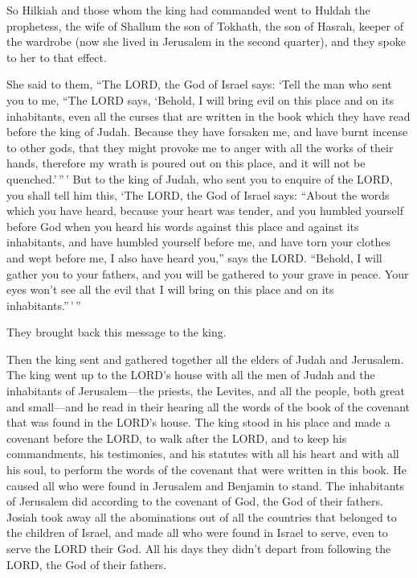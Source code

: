  So Hilkiah and those whom the king had commanded went to
Huldah the prophetess, the wife of Shallum the son of Tokhath, the son
of Hasrah, keeper of the wardrobe (now she lived in Jerusalem in the
second quarter), and they spoke to her to that effect.

 She said to them, ``The LORD, the God of Israel says:
`Tell the man who sent you to me,  ``The LORD says,
`Behold, I will bring evil on this place and on its inhabitants, even
all the curses that are written in the book which they have read before
the king of Judah.  Because they have forsaken me, and have
burnt incense to other gods, that they might provoke me to anger with
all the works of their hands, therefore my wrath is poured out on this
place, and it will not be quenched.'\,''\,'  But to the
king of Judah, who sent you to enquire of the LORD, you shall tell him
this, `The LORD, the God of Israel says: ``About the words which you
have heard,  because your heart was tender, and you humbled
yourself before God when you heard his words against this place and
against its inhabitants, and have humbled yourself before me, and have
torn your clothes and wept before me, I also have heard you,'' says the
LORD.  ``Behold, I will gather you to your fathers, and you
will be gathered to your grave in peace. Your eyes won't see all the
evil that I will bring on this place and on its inhabitants.''\,'\,''

They brought back this message to the king.

 Then the king sent and gathered together all the elders of
Judah and Jerusalem.  The king went up to the LORD's house
with all the men of Judah and the inhabitants of Jerusalem---the
priests, the Levites, and all the people, both great and small---and he
read in their hearing all the words of the book of the covenant that was
found in the LORD's house.  The king stood in his place and
made a covenant before the LORD, to walk after the LORD, and to keep his
commandments, his testimonies, and his statutes with all his heart and
with all his soul, to perform the words of the covenant that were
written in this book.  He caused all who were found in
Jerusalem and Benjamin to stand. The inhabitants of Jerusalem did
according to the covenant of God, the God of their fathers.
 Josiah took away all the abominations out of all the
countries that belonged to the children of Israel, and made all who were
found in Israel to serve, even to serve the LORD their God. All his days
they didn't depart from following the LORD, the God of their fathers.

